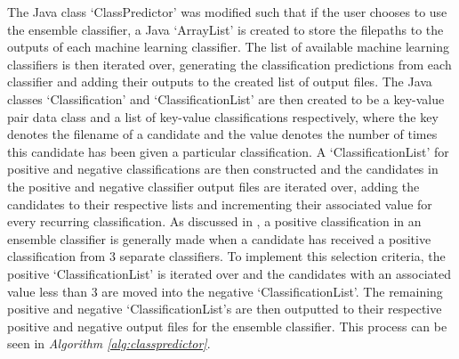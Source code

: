 \documentclass{article}
\begin{document}
The Java class `ClassPredictor' was modified such that if the user chooses to use the ensemble classifier, a Java `ArrayList' is created to store the filepaths to the outputs of each machine learning classifier. The list of available machine learning classifiers is then iterated over, generating the classification predictions from each classifier and adding their outputs to the created list of output files. The Java classes `Classification' and `ClassificationList' are then created to be a key-value pair data class and a list of key-value classifications respectively, where the key denotes the filename of a candidate and the value denotes the number of times this candidate has been given a particular classification. A `ClassificationList' for positive and negative classifications are then constructed and the candidates in the positive and negative classifier output files are iterated over, adding the candidates to their respective lists and incrementing their associated value for every recurring classification. As discussed in \textcite{tan}, a positive classification in an ensemble classifier is generally made when a candidate has received a positive classification from 3 separate classifiers. To implement this selection criteria, the positive `ClassificationList' is iterated over and the candidates with an associated value less than 3 are moved into the negative `ClassificationList'. The remaining positive and negative `ClassificationList's are then outputted to their respective positive and negative output files for the ensemble classifier. This process can be seen in \emph{Algorithm \ref{alg:classpredictor}}.
\end{document}
